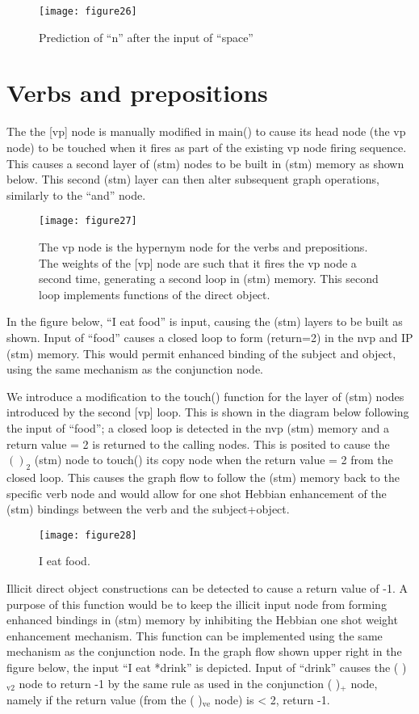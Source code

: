 \documentclass{clv3}
\begin{document}
\begin{figure}[H]
\texttt{[image: figure26]}
\caption{Prediction of ``n'' after the input of ``space''}
\end{figure}



\section{Verbs and prepositions}

The the [vp] node is manually modified in main() to cause  its head node (the vp node) to be touched when it fires as part of the existing vp node firing sequence.  This causes a second layer of (stm) nodes to be built in (stm) memory as shown below.  This second (stm) layer can then alter subsequent graph operations, similarly to the ``and'' node.  

\begin{figure}[H]
\texttt{[image: figure27]}
\caption{The vp node is the hypernym node for the  verbs and prepositions.   The weights of the  [vp] node are such that it  fires the vp node a second time, generating a second loop in (stm) memory.   This second loop implements functions of the direct object. }
\end{figure}

In the figure below, ``I eat food'' is input, causing the (stm) layers to be built as shown.   Input of ``food'' causes a closed loop to form (return=2) in the nvp and IP (stm) memory.   This would permit enhanced binding of the subject and object, using the same mechanism as the conjunction node.   

We introduce a modification to the touch() function for the layer of (stm) nodes introduced by the second [vp] loop.   This is shown in the diagram below following the input of ``food'';   a closed loop is detected in the nvp (stm) memory and a return value = 2 is returned to the calling nodes.   This is posited to cause the $( )_2$ (stm) node to touch() its copy node when the return value = 2 from the closed loop.   This causes the graph flow to follow the (stm) memory back to the specific verb node and would allow for one shot Hebbian enhancement of the (stm) bindings between the verb and the subject+object.   


\begin{figure}
\texttt{[image: figure28]}
\caption{I eat food. }
\end{figure}


Illicit direct object constructions can be detected to cause a return value of -1.  A purpose of this function would be to keep the illicit input node from forming enhanced bindings in (stm) memory by inhibiting the Hebbian one shot weight enhancement mechanism.   This function can be implemented using the same mechanism as the conjunction node.  In the graph flow shown upper right in the figure below, the input ``I eat *drink'' is depicted.   Input of ``drink'' causes the ( )$_{\mathrm{v2}}$ node to return -1 by the same rule as used in the conjunction ( )$_+$ node, namely if the return value (from the ( )$_{\mathrm{ve}}$ node) is < 2, return -1.
\end{document}
